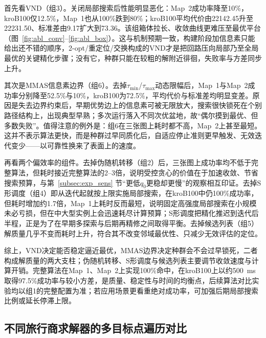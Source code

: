 \documentclass[lettersize,journal]{IEEEtran}
\begin{document}
首先看VND（组3）。关闭局部搜索后性能明显恶化：Map~2成功率降至10\%，kroB100仅12.5\%，Map~1也从100\%跌到80\%；kroB100平均代价由22142.45升至22231.50、标准差由9.17扩大到73.36。该组箱体拉长、收敛曲线更难压至最优平台（图~\textcolor{blue}{\ref{fig:abl_conv}}--\textcolor{blue}{\ref{fig:abl_box}}）。这与机制预期一致，构建阶段加信息素只能给出还不错的顺序，2-opt/重定位/交换构成的VND才是把回路压向局部乃至全局最优的关键精化步骤；没有它，种群只能在较粗的解附近徘徊，失败率与方差同步上升。

其次是MMAS信息素边界（组6）。去掉$\tau_{\min}$/$\tau_{\max}$动态限幅后，Map~1与Map~2成功率分别降至52.5\%与10\%，kroB100为72.5\%，平均代价与标准差均明显变差。原因是失去边界约束后，早期优势边上的信息素可被无限放大，搜索很快锁死在个别路径结构上，出现典型早熟；多次运行落入不同次优盆地，故“偶尔摸到最优、但多数失败”。值得注意的例外是：组6在三张图上耗时都不高，Map~2上甚至最短。这并不表示算法更快，而是种群过早同质化后，自适应停止准则更早触发、无效迭代变少——以可靠性换来了表面上的速度。

再看两个偏效率的组件。去掉伪随机转移（组2）后，三张图上成功率均不低于完整算法，但耗时接近完整算法的2--3倍，说明受控贪心的价值在于加速收敛、节省搜索预算，与第~\textcolor{blue}{\ref{subsec:exp_sens}} 节“更低$q_0$更稳却更慢”的观察相互印证。去掉S形调度（组4）即从迭代起就按上限实施局部搜索，在kroB100中仍100\%成功率，但耗时增加约1.7倍，Map~1上耗时反而最短，说明固定高强度局部搜索在小规模未必亏损，但在中大型实例上会迅速耗尽计算预算；S形调度把精化推迟到迭代后半程，正是为了在早期多探索与后期再精修之间取得平衡。去掉候选列表（组5）解质量几乎不变而耗时上升，符合其不改变邻域最优性、只减少无效评估的定位。

综上，VND决定能否稳定逼近最优，MMAS边界决定种群会不会过早锁死，二者构成解质量的两大支柱；伪随机转移、S形调度与候选列表主要调节收敛速度与计算开销。完整算法在Map~1、Map~2上实现100\%命中，在kroB100上以约500~ms取得97.5\%成功率与较小方差，是质量、稳定性与时间的均衡点，后续算法对比实验均以组1的完整配置为准；若应用场景更看重绝对成功率，可加强后期局部搜索比例或延长停滞上限。


\subsection{不同旅行商求解器的多目标点遍历对比}

\label{subsec:exp_cmp}
\end{document}

